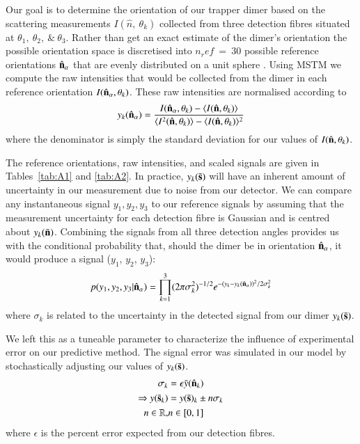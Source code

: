 \documentclass[final, 3p]{elsarticle}
\begin{document}
Our goal is to determine the orientation of our trapper dimer based on the scattering measurements $I(\hat{n}, \ \theta_k)$ collected from three detection fibres situated at $\theta_1,\ \theta_2, \ \& \ \theta_3$. Rather than get an exact estimate of the dimer's orientation the possible orientation space is discretised into $\textit{n}_ref \ = \ 30$ possible reference orientations $\hat{\bf n}_{\alpha}$ that are evenly distributed on a unit sphere \cite{Rey2006}. Using MSTM we compute the raw intensities that would be collected from the dimer in each reference orientation $I(\hat{\bf n}_{\alpha}, \theta_k)$. 
%
These raw intensities are normalised according to
\begin{align}
\label{eq:scale}
  y_k(\hat{\bf n}_\alpha)
  = 
  \frac{I(\hat{\bf n}_\alpha, \theta_k) - \langle I(\hat{\bf n},\theta_k) \rangle } 
  {\langle I^2(\hat{\bf n},\theta_k) \rangle -\langle I(\hat{\bf n}, \theta_k)\rangle^2}
\end{align}
where the denominator is simply the standard deviation for our values
of $I(\hat{\bf n}, \theta_k)$. 

The reference orientations, raw intensities, and scaled signals are given in Tables~\ref{tab:A1} and \ref{tab:A2}.
%
In practice, $y_k(\bar{\bf s})$ will have an inherent amount of
uncertainty in our measurement due to noise from our detector.  We can compare any instantaneous signal $y_1, y_2, y_3$ to our reference signals by assuming that the measurement uncertainty for each detection fibre is Gaussian and is centred about $y_k(\bar{\bf n})$.
%
Combining the signals from all three detection angles provides us with the conditional probability that, should the dimer be in orientation
$\hat{\bf n}_\alpha$, it would produce a signal ($y_1$, $y_2$, $y_3$):
\begin{align}
\label{eq:conditional}
  p(y_1, y_2, y_3|\hat{\bf n}_\alpha)
  = \prod^3_{k=1}
(2\pi\sigma_k^2)^{-1/2} 
e^{-(y_{k}-y_{k}(\hat{\bf n}_\alpha))^2/2\sigma_k^2}
\end{align}
where $\sigma_k$ is related to the uncertainty in the detected signal
from our dimer $y_k(\bar{\bf s})$. 
 
We left this as a tuneable parameter to characterize the influence of experimental error on our predictive method.  The signal error was simulated in our model by stochastically adjusting our values of $y_k(\bar{\bf s})$.
\begin{eqnarray*}
  \sigma_k&=\epsilon\bar{y}(\hat{\bf n}_k)
  \\
  \Rightarrow y(\bar{\bf s}_k)&=y(\bar{\bf s})_k \pm n\sigma_k
  \\ 
n \in \mathbb{R},&n\in[0,1]
\end{eqnarray*} 
where $\epsilon$ is the percent error expected from our detection
fibres.
\end{document}
